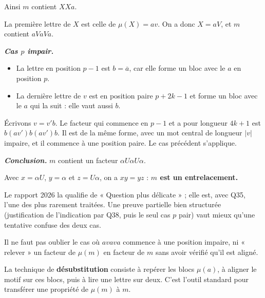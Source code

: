\documentclass[11pt,a4paper]{article}
\providecommand{\tightlist}{\setlength{\itemsep}{0pt}\setlength{\parskip}{0pt}}
\begin{document}
Ainsi \(m\) contient \(XXa\).

La première lettre de \(X\) est celle de \(\mu(X)=av\). On a donc \(X=aV\), et \(m\) contient \(aVaVa\).

\textbf{\emph{Cas \(p\) impair.}}

\begin{itemize}
\tightlist
\item
  La lettre en position \(p-1\) est \(b=\overline a\), car elle forme un bloc avec le \(a\) en position \(p\).
\item
  La dernière lettre de \(v\) est en position paire \(p+2k-1\) et forme un bloc avec le \(a\) qui la suit : elle vaut aussi \(b\).
\end{itemize}

Écrivons \(v=v'b\). Le facteur qui commence en \(p-1\) et a pour longueur \(4k+1\) est \(b(av')b(av')b\). Il est de la même forme, avec un mot central de longueur \(|v|\) impaire, et il commence à une position paire. Le cas précédent s'applique.

\textbf{\emph{Conclusion.}} \(m\) contient un facteur \(\alpha U\alpha U\alpha\).

Avec \(x=\alpha U\), \(y=\alpha\) et \(z=U\alpha\), on a \(xy=yz\) : \textbf{\(m\) est un entrelacement.}

\begin{jury}

Le rapport 2026 la qualifie de « Question plus délicate » ; elle est, avec Q35, l'une des plus rarement traitées. Une preuve partielle bien structurée (justification de l'indication par Q38, puis le seul cas \(p\) pair) vaut mieux qu'une tentative confuse des deux cas.

\end{jury}

\begin{piege}

Il ne faut pas oublier le cas où \(avava\) commence à une position impaire, ni « relever » un facteur de \(\mu(m)\) en facteur de \(m\) sans avoir vérifié qu'il est aligné.

\end{piege}

\begin{methode}

La technique de \textbf{désubstitution} consiste à repérer les blocs \(\mu(a)\), à aligner le motif sur ces blocs, puis à lire une lettre sur deux. C'est l'outil standard pour transférer une propriété de \(\mu(m)\) à \(m\).

\end{methode}
\end{document}
